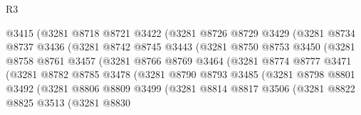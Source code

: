 \begin{lexlean}{R3}
\begin{coremodule}
                        @3415
                        (@3281
                          @8718
                          @8721
                          @3422
                          (@3281
                            @8726
                            @8729
                            @3429
                            (@3281
                              @8734
                              @8737
                              @3436
                              (@3281
                                @8742
                                @8745
                                @3443
                                (@3281
                                  @8750
                                  @8753
                                  @3450
                                  (@3281
                                    @8758
                                    @8761
                                    @3457
                                    (@3281
                                      @8766
                                      @8769
                                      @3464
                                      (@3281
                                        @8774
                                        @8777
                                        @3471
                                        (@3281
                                          @8782
                                          @8785
                                          @3478
                                          (@3281
                                            @8790
                                            @8793
                                            @3485
                                            (@3281
                                              @8798
                                              @8801
                                              @3492
                                              (@3281
                                                @8806
                                                @8809
                                                @3499
                                                (@3281
                                                  @8814
                                                  @8817
                                                  @3506
                                                  (@3281
                                                    @8822
                                                    @8825
                                                    @3513
                                                    (@3281
                                                      @8830

\end{coremodule}
\end{lexlean}
